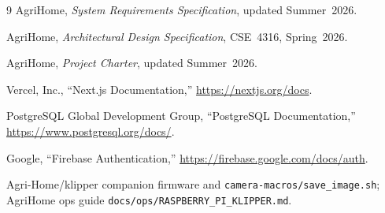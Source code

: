 \documentclass[11pt,letterpaper]{article}
\begin{document}
\newpage
\begin{thebibliography}{9}
AgriHome, \textit{System Requirements Specification}, updated Summer~2026.

AgriHome, \textit{Architectural Design Specification}, CSE~4316, Spring~2026.

AgriHome, \textit{Project Charter}, updated Summer~2026.

Vercel, Inc., ``Next.js Documentation,'' \url{https://nextjs.org/docs}.

PostgreSQL Global Development Group, ``PostgreSQL Documentation,''
\url{https://www.postgresql.org/docs/}.

Google, ``Firebase Authentication,'' \url{https://firebase.google.com/docs/auth}.

Agri-Home/klipper companion firmware and \texttt{camera-macros/save\_image.sh};
AgriHome ops guide \texttt{docs/ops/RASPBERRY\_PI\_KLIPPER.md}.
\end{thebibliography}
\end{document}
